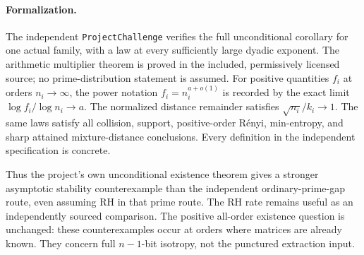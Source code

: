 \paragraph{Formalization.}
The independent \texttt{ProjectChallenge} verifies the full unconditional
corollary for one actual family, with a law at every sufficiently large
dyadic exponent. The arithmetic multiplier theorem is proved in the
included, permissively licensed source; no prime-distribution statement
is assumed. For positive quantities $f_i$ at orders $n_i\to\infty$, the
power notation $f_i=n_i^{a+o(1)}$ is recorded by the exact limit
$\log f_i/\log n_i\to a$. The normalized distance remainder satisfies
$\sqrt{n_i}/k_i\to1$. The same laws satisfy all collision, support,
positive-order R\'enyi, min-entropy, and sharp attained mixture-distance
conclusions. Every definition in the independent specification is concrete.

Thus the project's own unconditional existence theorem gives a
stronger asymptotic stability counterexample than the independent
ordinary-prime-gap route, even assuming RH in that prime route.
The RH rate remains useful as an independently sourced comparison.
The positive all-order existence question is unchanged: these
counterexamples occur at orders where matrices are already known.
They concern full $n-1$-bit isotropy, not the punctured extraction input.

